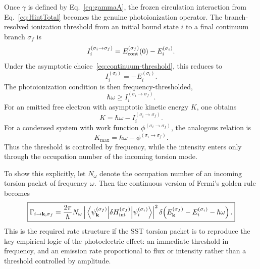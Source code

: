 \documentclass[11pt,a4paper]{article}
\begin{document}
Once $\gamma$ is defined by Eq.~\eqref{eq:gammaA}, the frozen circulation interaction from Eq.~\eqref{eq:HintTotal} becomes the genuine photoionization operator. The branch-resolved ionization threshold from an initial bound state $i$ to a final continuum branch $\sigma_f$ is
\begin{equation}
\label{eq:IonizationThresholdGeneral}
I_i^{(\sigma_i\to \sigma_f)}
=
E_{\rm cont}^{(\sigma_f)}(0)-E_i^{(\sigma_i)}.
\end{equation}
Under the asymptotic choice~\eqref{eq:continuum-threshold}, this reduces to
\begin{equation}
\label{eq:IonizationThresholdSimple}
I_i^{(\sigma_i)}=-E_i^{(\sigma_i)}.
\end{equation}
The photoionization condition is then frequency-thresholded,
\begin{equation}
\label{eq:PhotoThreshold}
\boxed{
\hbar\omega \ge I_i^{(\sigma_i\to \sigma_f)}.
}
\end{equation}
For an emitted free electron with asymptotic kinetic energy $K$, one obtains
\begin{equation}
\label{eq:KineticEnergyAtom}
\boxed{
K
=
\hbar\omega - I_i^{(\sigma_i\to \sigma_f)}.
}
\end{equation}
For a condensed system with work function $\phi^{(\sigma_i\to \sigma_f)}$, the analogous relation is
\begin{equation}
\label{eq:PhotoelectricSolid}
\boxed{
K_{\max}
=
\hbar\omega - \phi^{(\sigma_i\to \sigma_f)}.
}
\end{equation}
Thus the threshold is controlled by frequency, while the intensity enters only through the occupation number of the incoming torsion mode.

To show this explicitly, let $N_\omega$ denote the occupation number of an incoming torsion packet of frequency $\omega$. Then the continuous version of Fermi's golden rule \cite{Dirac1927} becomes
\begin{equation}
\label{eq:GoldenRuleContinuum}
\boxed{
\Gamma_{i\to \mathbf k,\sigma_f}
=
\frac{2\pi}{\hbar}
N_\omega
\left|
\matrixel{\psi_{\mathbf k}^{(\sigma_f)}}{\delta H_{\rm int}^{(\sigma_f)}}{\psi_i^{(\sigma_i)}}
\right|^2
\delta\!\left(
E_{\mathbf k}^{(\sigma_f)}-E_i^{(\sigma_i)}-\hbar\omega
\right).
}
\end{equation}
This is the required rate structure if the SST torsion packet is to reproduce the key empirical logic of the photoelectric effect: an immediate threshold in frequency, and an emission rate proportional to flux or intensity rather than a threshold controlled by amplitude.
\end{document}
